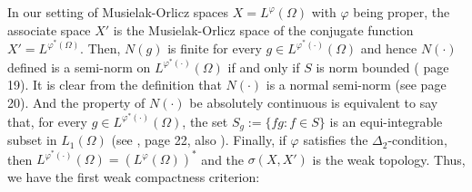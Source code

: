 \documentclass[11pt,a4paper]{amsart}
\newcommand{\lphi}{{L^{\varphi}(\Omega)}}
\begin{document}

In our setting of Musielak-Orlicz spaces $X=L^\varphi(\Omega)$ with $\varphi$ being proper, the associate space $X'$ is the Musielak-Orlicz space of the conjugate function $X'=L^{\varphi^*(\Omega)}$. Then, $N(g)$ is finite for every $g\in L^{\varphi^*(\cdot)}(\Omega)$ and hence $N(\cdot)$ defined is a semi-norm on $L^{\varphi^*(\cdot)}(\Omega)$ if and only if $S$ is norm bounded (\cite{Luxemburg} page 19). It is clear from the definition that $N(\cdot)$ is a normal semi-norm (see \cite{Luxemburg} page 20). And the property of $N(\cdot)$ be absolutely continuous is equivalent to say that, for every $g\in L^{\varphi^*(\cdot)}(\Omega)$, the set $S_g:=\{ fg: f\in S\}$ is an equi-integrable subset in $L_1(\Omega)$ (see \cite{Luxemburg}, page 22, also \cite{PCM2}). Finally, if $\varphi$ satisfies the $\Delta_2$-condition, then $L^{\varphi^*(\cdot)}(\Omega)=(L^{\varphi}(\Omega))^*$ and the $\sigma(X,X')$ is the weak topology. Thus, we have the first weak compactness criterion:
\end{document}
